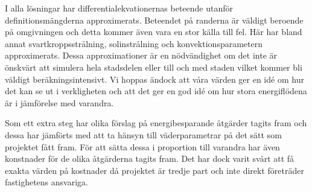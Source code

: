 I alla lösningar har differentialekvationernas beteende utanför definitionsmängderna approximerats. Beteendet på randerna
är väldigt beroende på omgivningen och detta kommer även vara en stor källa till fel. Här har bland annat svartkroppsstrålning,
solinstrålning och konvektionsparametern approximerats. Dessa approximationer är en nödvändighet om det inte är önskvärt att
simulera hela stadsdelen eller till och med staden vilket kommer bli väldigt beräkningsintensivt. Vi hoppas ändock att våra
värden ger en idé om hur det kan se ut i verkligheten och att det ger en god idé om hur stora energiflödena är i jämförelse med varandra.

Som ett extra steg har olika förslag på energibesparande åtgärder tagits fram och dessa har jämförts med att ta hänsyn till väderparametrar på det sätt som projektet fått fram. För att sätta dessa i proportion till varandra har även konstnader för de olika åtgärderna tagits fram. Det har dock varit svårt att få exakta värden på kostnader då projektet är tredje part och inte direkt företräder fastighetens ansvariga.
